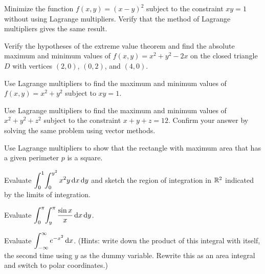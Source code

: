 \documentclass{watsonbook}
\begin{document}
\begin{aexercise}
  Minimize the function $f(x,y) = (x-y)^2$ subject to the constraint
  $xy = 1$ without using Lagrange multipliers. Verify that the method
  of Lagrange multipliers gives the same result.
\end{aexercise}

\begin{aexercise}
  Verify the hypotheses of the extreme value theorem and find the
  absolute maximum and minimum values of $f(x,y) = x^2+y^2-2x$ on the
  closed triangle $D$ with vertices $(2,0)$, $(0,2)$, and $(4,0)$.
\end{aexercise}

\begin{aexercise}
  Use Lagrange multipliers to find the maximum and minimum values of
  $f(x,y) = x^2 + y^2$ subject to $xy = 1$.
\end{aexercise}

\begin{aexercise}
  Use Lagrange multipliers to find the maximum and minimum values of
  $x^2 + y^2 + z^2$ subject to the constraint $x + y + z =
  12$. Confirm your answer by solving the same problem using vector
  methods.
\end{aexercise}

\begin{aexercise}
  Use Lagrange multipliers to show that the rectangle with maximum
  area that has a given perimeter $p$ is a square.
\end{aexercise}


\begin{aexercise}
  Evaluate
  $\displaystyle{\int_{0}^{1}\!\int_{0}^{y^2} x^2 y \,\mathrm{d}x\,\mathrm{d}y}$ and
  sketch the region of integration in $\mathbb{R}^2$ indicated by the limits
  of integration.
\end{aexercise}

\begin{aexercise}
  Evaluate $\displaystyle{\int_{0}^\pi \!\int_{y}^{\pi}\frac{\sin x}{x} \,\mathrm{d}x\,\mathrm{d}y}$.
\end{aexercise}

\begin{aexercise}%
  Evaluate $\displaystyle{\int_{-\infty}^{\infty} e^{-x^2}\,\mathrm{d}x}$. (Hints: write down
  the product of this integral with itself, the second time using $y$
  as the dummy variable. Rewrite this as an area integral and switch
  to polar coordinates.)
\end{aexercise}
\end{document}
